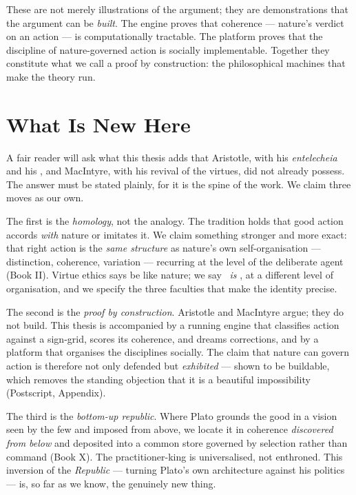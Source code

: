 These are not merely illustrations of the argument; they are demonstrations that
the argument can be \emph{built}. The engine proves that coherence --- nature's
verdict on an action --- is computationally tractable. The platform proves that
the discipline of nature-governed action is socially implementable. Together
they constitute what we call a proof by construction: the philosophical machines
that make the theory run.

\section{What Is New Here}

A fair reader will ask what this thesis adds that Aristotle, with his
\emph{entelecheia} and his \praxis, and MacIntyre, with his revival of the
virtues, did not already possess. The answer must be stated plainly, for it is the
spine of the work. We claim three moves as our own.

The first is the \emph{homology}, not the analogy. The tradition holds that good
action accords \emph{with} nature or imitates it. We claim something stronger and
more exact: that right action is the \emph{same structure} as nature's own
self-organisation --- distinction, coherence, variation --- recurring at the level
of the deliberate agent (Book II). Virtue ethics says be like nature; we say
\praxis\ \emph{is} \physis, at a different level of organisation, and we specify
the three faculties that make the identity precise.

The second is the \emph{proof by construction}. Aristotle and MacIntyre argue;
they do not build. This thesis is accompanied by a running engine that classifies
action against a sign-grid, scores its coherence, and dreams corrections, and by a
platform that organises the disciplines socially. The claim that nature can govern
action is therefore not only defended but \emph{exhibited} --- shown to be
buildable, which removes the standing objection that it is a beautiful
impossibility (Postscript, Appendix).

The third is the \emph{bottom-up republic}. Where Plato grounds the good in a
vision seen by the few and imposed from above, we locate it in coherence
\emph{discovered from below} and deposited into a common store governed by
selection rather than command (Book X). The practitioner-king is universalised,
not enthroned. This inversion of the \emph{Republic} --- turning Plato's own
architecture against his politics --- is, so far as we know, the genuinely new
thing.

